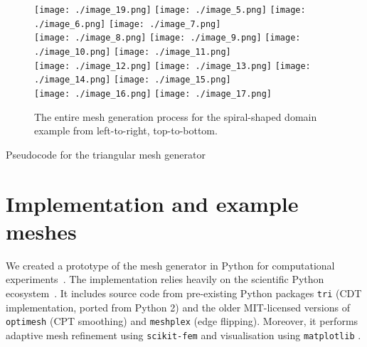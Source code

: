 \documentclass[12pt]{rmstyle}
\begin{document}
\begin{figure}[htbp]
  \centering
  \texttt{[image: ./image\_19.png]}
  \texttt{[image: ./image\_5.png]}
  \texttt{[image: ./image\_6.png]}
  \texttt{[image: ./image\_7.png]}\\
  \texttt{[image: ./image\_8.png]}
  \texttt{[image: ./image\_9.png]}
  \texttt{[image: ./image\_10.png]}
  \texttt{[image: ./image\_11.png]}\\
  \texttt{[image: ./image\_12.png]}
  \texttt{[image: ./image\_13.png]}
  \texttt{[image: ./image\_14.png]}
  \texttt{[image: ./image\_15.png]}\\
  \texttt{[image: ./image\_16.png]}
  \texttt{[image: ./image\_17.png]}
  \hspace{0.48\textwidth}
  \caption{The entire mesh generation process for the spiral-shaped domain
    example from left-to-right, top-to-bottom.}
\label{fig:spiralexample}
\end{figure}

\begin{algorithm}[H]
  \caption{Pseudocode for the triangular mesh generator}
  \label{alg:meshgen}
  \begin{algorithmic}[1]
    \Statex
    \EndFor
    \State {}
    \EndFunction
  \end{algorithmic}
\end{algorithm}


\section{Implementation and example meshes}

We created a prototype of the mesh generator in Python for computational
experiments~\cite{adaptmesh2020}.  The implementation relies heavily on the
scientific Python ecosystem~\cite{virtanen2020scipy}.  It includes source code
from pre-existing Python packages \verb|tri| \cite{tri} (CDT implementation,
ported from Python 2) and the older MIT-licensed versions of \verb|optimesh|
\cite{optimesh} (CPT smoothing) and \verb|meshplex| \cite{meshplex} (edge
flipping).  Moreover, it performs adaptive mesh refinement using
\verb|scikit-fem| \cite{gustafsson2020scikit} and visualisation using
\verb|matplotlib| \cite{hunter2007matplotlib}.
\end{document}
